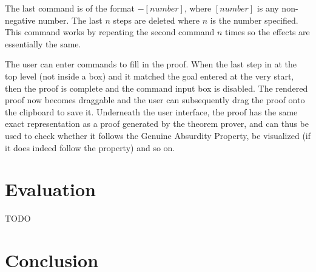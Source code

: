 \documentclass[11pt,twoside,a4paper]{report}
\begin{document}
The last command is of the format $-[number]$, where $[number]$ is any non-negative number. The last $n$ steps are deleted where $n$ is the number specified. This command works by repeating the second command $n$ times so the effects are essentially the same.

The user can enter commands to fill in the proof. When the last step in at the top level (not inside a box) and it matched the goal entered at the very start, then the proof is complete and the command input box is disabled. The rendered proof now becomes draggable and the user can subsequently drag the proof onto the clipboard to save it. Underneath the user interface, the proof has the same exact representation as a proof generated by the theorem prover, and can thus be used to check whether it follows the Genuine Absurdity Property, be visualized (if it does indeed follow the property) and so on.

\chapter{Evaluation}
\label{chap:eval}
TODO

\chapter{Conclusion}
\label{chap:chiliconclusion}

\listoffigures

\lstlistoflistings



\end{document}
